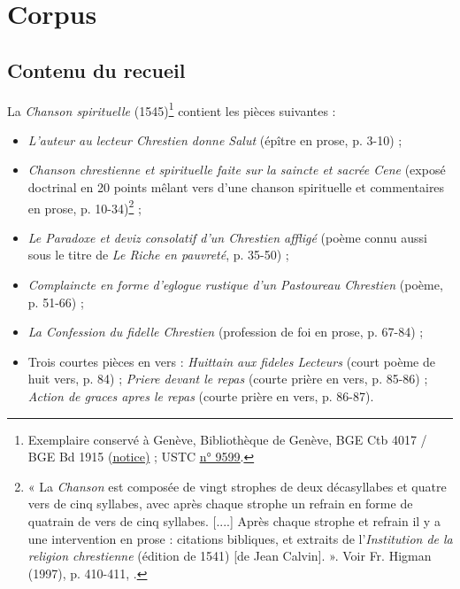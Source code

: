 \documentclass[final, fra]{anthology-ch}
\begin{document}
\section{Corpus}
\label{sec:problem-corpus}

\subsection{Contenu du recueil}
\label{sec:content-cs}
La \textit{Chanson spirituelle} (1545)\footnote{Exemplaire conservé à Genève, Bibliothèque de Genève, BGE Ctb 4017 / BGE Bd 1915 (\href{https://vge.swisscovery.ch/permalink/41SLSP_VGE/1jcob8j/alma991005886529705524}{\underline{notice})} ; USTC \href{https://www.ustc.ac.uk/editions/9599}{\underline{n° 9599}}.} contient les pièces suivantes :

\begin{itemize}
    \item \textit{L'auteur au lecteur Chrestien donne Salut} (épître en prose, p. 3-10) ;
    \item \textit{Chanson chrestienne et spirituelle faite sur la saincte et sacrée Cene} (exposé doctrinal en 20 points mêlant vers d'une chanson spirituelle et commentaires en prose, p. 10-34)\footnote{« La \textit{Chanson} est composée de vingt strophes de deux décasyllabes et quatre vers de cinq syllabes, avec après chaque strophe un refrain en forme de quatrain de vers de cinq syllabes. [....] Après chaque strophe et refrain il y a une intervention en prose : citations bibliques, et extraits de l'\textit{Institution de la religion chrestienne} (édition de 1541) [de Jean Calvin]. ». Voir Fr. Higman (1997), p. 410-411, \cite{higman2023}.} ;
    \item \textit{Le Paradoxe et deviz consolatif d'un Chrestien affligé} (poème connu aussi sous le titre de \textit{Le Riche en pauvreté}, p. 35-50) ;
    \item \textit{Complaincte en forme d'eglogue rustique d'un Pastoureau Chrestien} (poème, p. 51-66) ;
    \item \textit{La Confession du fidelle Chrestien} (profession de foi en prose, p. 67-84) ;
    \item Trois courtes pièces en vers : \textit{Huittain aux fideles Lecteurs} (court poème de huit vers, p. 84) ; \textit{Priere devant le repas} (courte prière en vers, p. 85-86) ; \textit{Action de graces apres le repas} (courte prière en vers, p. 86-87).
\end{itemize}
\end{document}
